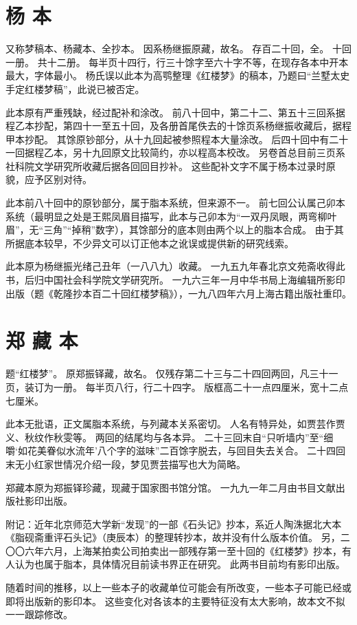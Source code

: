 \section*{杨 本}
又称梦稿本、杨藏本、全抄本。
因系杨继振原藏，故名。
存百二十回，全。
十回一册。
共十二册。
每半页十四行，行三十馀字至六十字不等，在现存各本中开本最大，字体最小。
杨氏误以此本为高鹗整理《红楼梦》的稿本，乃题曰“兰墅太史手定红楼梦稿”，此说已被否定。
\par
此本原有严重残缺，经过配补和涂改。
前八十回中，第二十二、第五十三回系据程乙本抄配，第四十一至五十回，及各册首尾佚去的十馀页系杨继振收藏后，据程甲本抄配。
其馀原钞部分，从十九回起被参照程本大量涂改。
后四十回中有二十一回据程乙本，另十九回原文比较简约，亦以程高本校改。
另卷首总目前三页系社科院文学研究所收藏后据各回回目抄补。
这些配补文字不属于杨本过录时原貌，应予区别对待。
\par
此本前八十回中的原钞部分，属于脂本系统，但来源不一。
前七回公认属己卯本系统（最明显之处是王熙凤眉目描写，此本与己卯本为“一双丹凤眼，两弯柳叶眉”，无“三角”“掉稍”数字），其馀部分的底本则由两个以上的脂本合成。
由于其所据底本较早，不少异文可以订正他本之讹误或提供新的研究线索。
\par
此本原为杨继振光绪己丑年（一八八九）收藏。
一九五九年春北京文苑斋收得此书，后归中国社会科学院文学研究所。
一九六三年一月中华书局上海编辑所影印出版（题《乾隆抄本百二十回红楼梦稿》），一九八四年六月上海古籍出版社重印。
\par
\section*{郑 藏 本}
题“红楼梦”。
原郑振铎藏，故名。
仅残存第二十三与二十四回两回，凡三十一页，装订为一册。
每半页八行，行二十四字。
版框高二十一点四厘米，宽十二点七厘米。
\par
此本无批语，正文属脂本系统，与列藏本关系密切。
人名有特异处，如贾芸作贾义、秋纹作秋雯等。
两回的结尾均与各本异。
二十三回末自“只听墙内”至“细嚼‘如花美眷似水流年’八个字的滋味”二百馀字脱去，与回目失去关合。
二十四回末无小红家世情况介绍一段，梦见贾芸描写也大为简略。
\par
郑藏本原为郑振铎珍藏，现藏于国家图书馆分馆。
一九九一年二月由书目文献出版社影印出版。
\par
附记：近年北京师范大学新“发现”的一部《石头记》抄本，系近人陶洙据北大本《脂砚斋重评石头记》（庚辰本）的整理转抄本，故并没有什么版本价值。
另，二〇〇六年六月，上海某拍卖公司拍卖出一部残存第一至十回的《红楼梦》抄本，有人认为也属于脂本，具体情况目前读书界正在研究。
此两书目前均有影印出版。
\par
随着时间的推移，以上一些本子的收藏单位可能会有所改变，一些本子可能已经或即将出版新的影印本。
这些变化对各该本的主要特征没有太大影响，故本文不拟一一跟踪修改。
\par